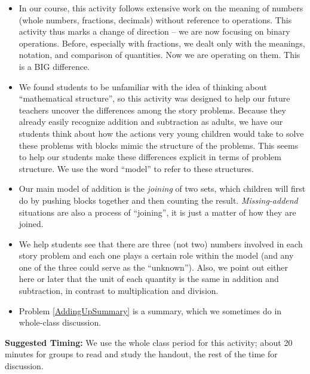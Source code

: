 \documentclass[nooutcomes]{ximera}
\begin{document}
\begin{instructorNotes}
\begin{itemize}
	\item In our course, this activity follows extensive work on the meaning of numbers (whole numbers, fractions, decimals) without reference to operations.  This activity thus marks a change of direction -- we are now focusing on binary operations. Before, especially with fractions, we dealt only with the meanings, notation, and comparison of quantities.  Now we are operating on them. This is a BIG difference.
	\item We found students to be unfamiliar with the idea of thinking about ``mathematical structure'', so this activity was designed to	help our future teachers uncover the differences among the story problems.  Because they already easily recognize addition and subtraction as adults, we have our students think about how the actions very young children would take to solve these problems with blocks mimic the structure of the problems. This seems to help our students make these differences explicit in terms of problem structure.  We use the word ``model'' to refer to these structures.
	\item Our main model of addition is the {\em joining} of two sets, which children will first do by pushing blocks together and then counting the result.  {\em Missing-addend} situations are also a process of ``joining'', it is just a matter of how they are joined.
	\item We help students see that there are three (not two) numbers involved in each story problem and each one plays a certain role within the model (and any one of the three could serve as the ``unknown'').  Also, we point out either here or later that the unit of each quantity is the same in addition and subtraction, in contrast to multiplication and division.
	\item Problem \ref{AddingUpSummary} is a summary, which we sometimes do in whole-class discussion.
\end{itemize}

{\bf Suggested Timing:} We use the whole class period for this activity; about 20 minutes for groups to read and study the handout, the rest of the time for discussion. 
\end{instructorNotes}
\end{document}
